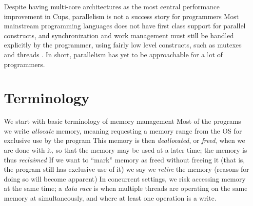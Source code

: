 \documentclass[b5paper]{report}
\begin{document}
Despite having multi-core architectures as the most central performance
improvement in Cups, parallelism is not a success story for programmers Most
mainstream programming languages does not have first class support for parallel
constructs, and synchronization and work management must still be
handled explicitly by the programmer, using fairly low level constructs, such
as mutexes and threads .
In short, parallelism has yet to be approachable for a lot of programmers.


\subsection*{}

\section{Terminology}
We start with basic terminology of memory management Most of the programs we
write \emph{allocate} memory, meaning requesting a memory range from the OS for
exclusive use by the program This memory is then \emph{deallocated}, or
\emph{freed}, when we are done with it, so that the memory may be used at a
later time; the memory is thus \emph{reclaimed} If we want to ``mark'' memory
as freed without freeing it (that is, the program still has exclusive use of
it) we say we \emph{retire} the memory (reasons for doing so will become
apparent) In concurrent settings, we risk accessing memory at the same time;
a \emph{data race} is when multiple threads are operating on the same memory at
simultaneously, and where at least one operation is a write.
\end{document}
